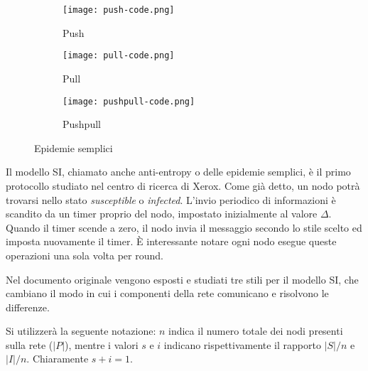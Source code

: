 \begin{figure}[!htb]
    \begin{subfigure}{0.32\textwidth}
      \texttt{[image: push-code.png]}
      \caption{Push}\label{fig:push_code}
    \end{subfigure}\hfill
    \begin{subfigure}{0.32\textwidth}
      \texttt{[image: pull-code.png]}
      \caption{Pull}\label{fig:pull_code}
    \end{subfigure}\hfill
    \begin{subfigure}{0.32\textwidth}
      \texttt{[image: pushpull-code.png]}
      \caption{Pushpull}\label{fig:pushpull_code}
    \end{subfigure}
    \caption{Epidemie semplici}
    \label{fig:simple_epidemics}
    \end{figure}
Il modello SI, chiamato anche anti-entropy o delle epidemie semplici, è il primo protocollo studiato nel centro di ricerca di Xerox. Come già detto, un nodo potrà trovarsi nello stato \textit{susceptible} o \textit{infected}. L'invio periodico di informazioni è scandito da un timer proprio del nodo, impostato inizialmente al valore $\Delta$. Quando il timer scende a zero, il nodo invia il messaggio secondo lo stile scelto ed imposta nuovamente il timer. È interessante notare ogni nodo esegue queste operazioni una sola volta per round.

Nel documento originale vengono esposti e studiati tre stili per il modello SI, che cambiano il modo in cui i componenti della rete comunicano e risolvono le differenze. 

Si utilizzerà la seguente notazione: $n$ indica il numero totale dei nodi presenti sulla rete ($|P|$), mentre i valori $s$ e $i$ indicano rispettivamente il rapporto $|S|/n$ e $|I|/n$. Chiaramente $s + i = 1$.
